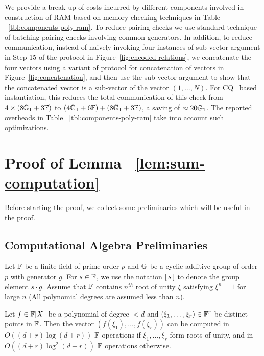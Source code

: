 We provide a break-up of costs incurred by different components involved in construction
of RAM based on memory-checking techniques in Table ~\ref{tbl:components-poly-ram}. To reduce pairing
checks we use standard technique of batching pairing checks involving common generators. In addition, to reduce
communication, instead of naively invoking four instances of sub-vector argument in Step 15 of the protocol
in Figure~\ref{fig:encoded-relations}, we concatenate the four vectors using a variant of protocol for
concatenation of vectors in Figure~\ref{fig:concatenation}, and then use the sub-vector argument to show that
the concatenated vector is a sub-vector of the vector $(1,\ldots,N)$. For CQ~\cite{EPRINT:EagFioGab22} based instantiation,
this reduces the total communication of this
check from $4\times (8\mathbb{G}_1 + 3\mathbb{F})$ to $(4\mathbb{G}_1+6\mathbb{F}) + (8\mathbb{G}_1 + 3\mathbb{F})$, a saving of $\approx 20\mathbb{G}_1$. The reported
overheads in Table ~\ref{tbl:components-poly-ram} take into account such optimizations.

\section{Proof of Lemma ~\ref{lem:sum-computation}}
Before starting the proof, we collect some preliminaries which will be useful in the proof.

\subsection{Computational Algebra Preliminaries}\label{subsec:comp-algebra-app}
Let $\mathbb{F}$ be a finite field of prime order $p$ and $\mathbb{G}$ be a cyclic additive group of order $p$ with generator $g$. For $s \in \mathbb{F}$, we use
the notation $[\,{s}\,]$ to denote the group element $s\cdot g$. Assume that $\mathbb{F}$ contains $n^{th}$ root of unity $\xi$
satisfying $\xi^n=1$ for large $n$ (All polynomial degrees are assumed less than $n$).

\begin{fact}\label{fc:fft}
Let $f\in \mathbb{F}[X]$ be a polynomial of degree $<d$ and $(\xi_1,\ldots,\xi_r)\in \mathbb{F}^r$ be distinct points in $\mathbb{F}$.
Then the vector $(f(\xi_1),\ldots,f(\xi_r))$ can be computed in $O((d+r)\log (d+r))$ $\mathbb{F}$ operations if $\xi_1,\ldots,\xi_r$ form roots
of unity, and in $O((d+r)\log^2(d+r))$ $\mathbb{F}$ operations otherwise.
\end{fact}

